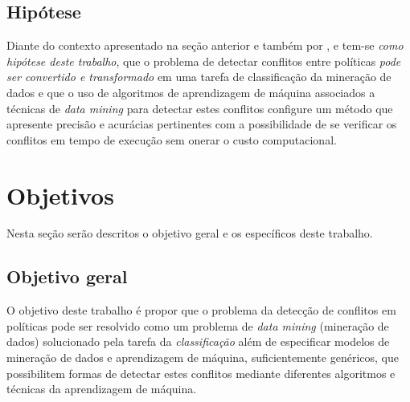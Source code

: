 \documentclass[
	12pt,				%
	openright,			%
	oneside,			%
	a4paper,			%
	english,			%
	french,				%
	spanish,			%
	brazil				%
	]{abntex2}
\begin{document}

\subsection{Hipótese}\label{hipótese}
Diante do contexto apresentado na seção anterior e também por ,  e  tem-se \textit{como hipótese deste trabalho}, que o problema de detectar conflitos entre políticas\textit{ pode ser convertido e transformado} em uma tarefa de classificação da mineração de dados e que o uso de algoritmos de aprendizagem de máquina associados a técnicas de \textit{data mining} para detectar estes conflitos configure um método que apresente precisão e acurácias pertinentes com a possibilidade de se verificar os conflitos em tempo de execução sem onerar o custo computacional.

\section{Objetivos}\label{objetivos}
Nesta seção serão descritos o objetivo geral e os específicos deste trabalho.
\subsection{Objetivo geral}\label{objetivo_geral}
O objetivo deste trabalho é propor que o problema da detecção de conflitos em políticas pode ser resolvido como um problema de \textit{data mining} (mineração de dados) solucionado pela tarefa da \textit{classificação} além de especificar modelos de mineração de dados e aprendizagem de máquina, suficientemente genéricos, que possibilitem formas de detectar estes conflitos mediante diferentes algoritmos e técnicas da aprendizagem de máquina.
\end{document}
